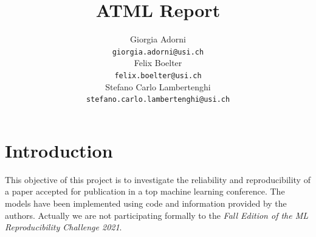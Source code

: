 \documentclass{article}
\title{ATML Report}
\author{%
		Giorgia Adorni \\
		\texttt{giorgia.adorni@usi.ch} \\
		\And
		Felix Boelter\\
		\texttt{felix.boelter@usi.ch}\\
		\And
		Stefano Carlo Lambertenghi\\
		\texttt{stefano.carlo.lambertenghi@usi.ch}\\
}
\begin{document}
	
	\maketitle
	
	\begin{abstract}
	\end{abstract}
	
	
	\section{Introduction}
	This objective of this project is to investigate the reliability and reproducibility of a paper accepted 
	for publication in a top machine learning conference.
	The models have been implemented using code and information provided by the authors.	
	Actually we are not participating formally to the \textit{Fall Edition of the ML Reproducibility 
	Challenge 2021}.
	
\end{document}
